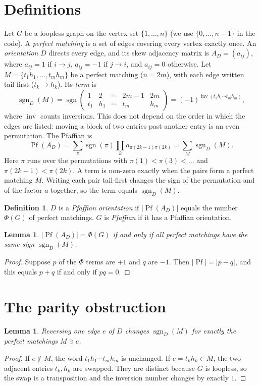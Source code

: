 \documentclass[11pt]{article}
\newtheorem{lemma}[theorem]{Lemma}
\theoremstyle{definition}
\newtheorem{definition}[theorem]{Definition}
\theoremstyle{remark}
\begin{document}
\section{Definitions}
Let $G$ be a loopless graph on the vertex set $\{1,\dots,n\}$ (we use $\{0,\dots,n-1\}$
in the code). A \emph{perfect matching} is a set of edges covering every vertex
exactly once. An \emph{orientation} $D$ directs every edge, and its skew adjacency
matrix is $A_D=(a_{ij})$, where $a_{ij}=1$ if $i\to j$, $a_{ij}=-1$ if $j\to i$, and
$a_{ij}=0$ otherwise. Let $M=\{t_1h_1,\dots,t_mh_m\}$ be a perfect matching
($n=2m$), with each edge written tail-first ($t_k\to h_k$). Its \emph{term} is
\[
  \operatorname{sgn}_D(M)=\operatorname{sgn}\begin{pmatrix}1&2&\cdots&2m-1&2m\\
  t_1&h_1&\cdots&t_m&h_m\end{pmatrix}=(-1)^{\operatorname{inv}(t_1h_1\cdots t_mh_m)},
\]
where $\operatorname{inv}$ counts inversions. This does not depend on the order in
which the edges are listed: moving a block of two entries past another entry is an
even permutation. The Pfaffian is
\[
\operatorname{Pf}(A_D)=\sum_{\pi}\operatorname{sgn}(\pi)\prod_{k}a_{\pi(2k-1)\pi(2k)}
=\sum_{M}\operatorname{sgn}_D(M).
\]
Here $\pi$ runs over the permutations with $\pi(1)<\pi(3)<\dots$ and
$\pi(2k-1)<\pi(2k)$. A term is non-zero exactly when the pairs form a perfect
matching $M$. Writing each pair tail-first changes the sign of the permutation
and of the factor $a$ together, so the term equals $\operatorname{sgn}_D(M)$.

\begin{definition}
$D$ is a \emph{Pfaffian orientation} if $|\operatorname{Pf}(A_D)|$ equals the number
$\Phi(G)$ of perfect matchings. $G$ is \emph{Pfaffian} if it has a Pfaffian orientation.
\end{definition}

\begin{lemma}\label{lem:equiv}
$|\operatorname{Pf}(A_D)|=\Phi(G)$ if and only if all perfect matchings have the same sign
$\operatorname{sgn}_D(M)$.
\end{lemma}
\begin{proof}
Suppose $p$ of the $\Phi$ terms are $+1$ and $q$ are $-1$. Then
$|\operatorname{Pf}|=|p-q|$, and this equals $p+q$ if and only if $pq=0$.
\end{proof}

\section{The parity obstruction}
\begin{lemma}\label{lem:flip}
Reversing one edge $e$ of $D$ changes $\operatorname{sgn}_D(M)$ for exactly the perfect
matchings $M\ni e$.
\end{lemma}
\begin{proof}
If $e\notin M$, the word $t_1h_1\cdots t_mh_m$ is unchanged. If $e=t_kh_k\in M$, the
two adjacent entries $t_k,h_k$ are swapped. They are distinct because $G$ is
loopless, so the swap is a transposition and the inversion number changes by
exactly $1$.
\end{proof}
\end{document}

